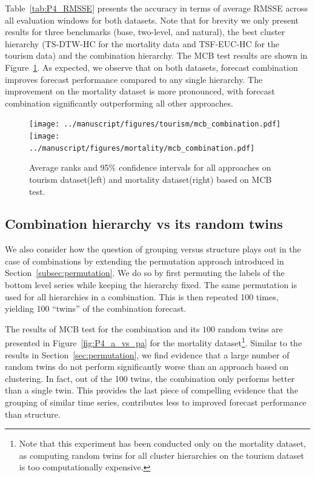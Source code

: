 \documentclass[a4paper,review,12pt,authoryear]{elsarticle}
\begin{document}
Table~\ref{tab:P4_RMSSE} presents the accuracy in terms of average RMSSE across all evaluation windows for both datasets. Note that for brevity we only present results for three benchmarks (base, two-level, and natural), the best cluster hierarchy (TS-DTW-HC for the mortality data and TSF-EUC-HC for the tourism data) and the combination hierarchy. The MCB test results are shown in Figure~\ref{fig:P4_bench_mcb}. 
As expected, we observe that on both datasets, forecast combination improves forecast performance compared to any single hierarchy. 
The improvement on the mortality dataset is more pronounced, with forecast combination significantly outperforming all other approaches.

\begin{figure}[h!]
    \centering
    \texttt{[image: ../manuscript/figures/tourism/mcb\_combination.pdf]}
    \texttt{[image: ../manuscript/figures/mortality/mcb\_combination.pdf]}
    \caption{Average ranks and 95\% confidence intervals for all approaches on tourism dataset(left) and mortality dataset(right) based on MCB test.}
    \label{fig:P4_bench_mcb}
\end{figure}



\subsection{Combination hierarchy vs its random twins}

We also consider how the question of grouping versus structure plays out in the case of combinations by extending the permutation approach introduced in Section~\ref{subsec:permutation}. We do so by first permuting the labels of the bottom level series while keeping the hierarchy fixed. The same permutation is used for all hierarchies in a combination. This is then repeated 100 times, yielding 100 ``twins'' of the combination forecast.



The results of MCB test for the combination and its $100$ random twins are presented in Figure~\ref{fig:P4_a_vs_pa} for the mortality dataset\footnote{Note that this experiment has been conducted only on the mortality dataset, as computing random twins for all cluster hierarchies on the tourism dataset is too computationally expensive.}.
Similar to the results in Section~\ref{sec:permutation}, we find evidence that a large number of random twins do not perform significantly worse than an approach based on clustering. In fact, out of the 100 twins, the combination only performs better than a single twin. This provides the last piece of compelling evidence that the grouping of similar time series, contributes less to improved forecast performance than structure.
\end{document}
